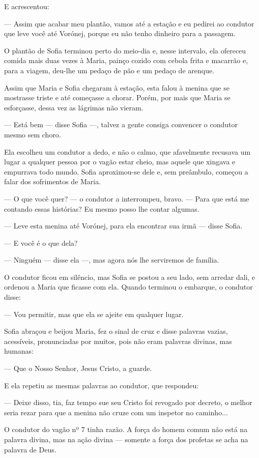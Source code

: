 E acrescentou:

--- Assim que acabar meu plantão, vamos até a estação e eu pedirei ao
condutor que leve você até Vorónej, porque eu não tenho dinheiro para a
passagem.

O plantão de Sofia terminou perto do meio-dia e, nesse intervalo, ela
ofereceu comida mais duas vezes à Maria, painço cozido com cebola frita
e macarrão e, para a viagem, deu-lhe um pedaço de pão e um pedaço de
arenque.

Assim que Maria e Sofia chegaram à estação, esta falou à menina que se
mostrasse triste e até começasse a chorar. Porém, por mais que Maria se
esforçasse, dessa vez as lágrimas não vieram.

--- Está bem --- disse Sofia ---, talvez a gente consiga convencer o
condutor mesmo sem choro.

Ela escolheu um condutor a dedo, e não o calmo, que afavelmente recusava
um lugar a qualquer pessoa por o vagão estar cheio, mas aquele que
xingava e empurrava todo mundo. Sofia aproximou-se dele e, sem
preâmbulo, começou a falar dos sofrimentos de Maria.

--- O que você quer? --- o condutor a interrompeu, bravo. --- Para que
está me contando essas histórias? Eu mesmo posso lhe contar algumas.

--- Leve esta menina até Vorónej, para ela encontrar sua irmã --- disse
Sofia.

--- E você é o que dela?

--- Ninguém --- disse ela ---, mas agora nós lhe serviremos de família.

O condutor ficou em silêncio, mas Sofia se postou a seu lado, sem
arredar dali, e ordenou a Maria que ficasse com ela. Quando terminou o
embarque, o condutor disse:

--- Vou permitir, mas que ela se ajeite em qualquer lugar.

Sofia abraçou e beijou Maria, fez o sinal de cruz e disse palavras
vazias, acessíveis, pronunciadas por muitos, pois não eram palavras
divinas, mas humanas:

--- Que o Nosso Senhor, Jesus Cristo, a guarde.

E ela repetiu as mesmas palavras ao condutor, que respondeu:

--- Deixe disso, tia, faz tempo sue seu Cristo foi revogado por decreto,
o melhor seria rezar para que a menina não cruze com um inspetor no
caminho...

O condutor do vagão nº 7 tinha razão. A força do homem comum não está na
palavra divina, mas na ação divina --- somente a força dos profetas se
acha na palavra de Deus.

